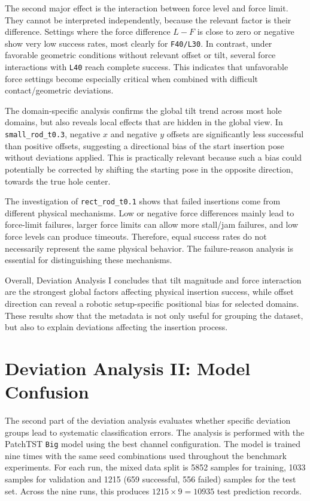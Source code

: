 The second major effect is the interaction between force level and force limit. They cannot be interpreted independently, because the relevant factor is their difference. Settings where the force difference $L-F$ is close to zero or negative show very low success rates, most clearly for \texttt{F40/L30}. In contrast, under favorable geometric conditions without relevant offset or tilt, several force interactions with \texttt{L40} reach complete success. This indicates that unfavorable force settings become especially critical when combined with difficult contact/geometric deviations.

The domain-specific analysis confirms the global tilt trend across most hole domains, but also reveals local effects that are hidden in the global view. In \texttt{small\_rod\_t0.3}, negative $x$ and negative $y$ offsets are significantly less successful than positive offsets, suggesting a directional bias of the start insertion pose without deviations applied. This is practically relevant because such a bias could potentially be corrected by shifting the starting pose in the opposite direction, towards the true hole center.

The investigation of \texttt{rect\_rod\_t0.1} shows that failed insertions come from different physical mechanisms. Low or negative force differences mainly lead to force-limit failures, larger force limits can allow more stall/jam failures, and low force levels can produce timeouts. Therefore, equal success rates do not necessarily represent the same physical behavior. The failure-reason analysis is essential for distinguishing these mechanisms.

Overall, Deviation Analysis I concludes that tilt magnitude and force interaction are the strongest global factors affecting physical insertion success, while offset direction can reveal a robotic setup-specific positional bias for selected domains. These results show that the metadata is not only useful for grouping the dataset, but also to explain deviations affecting the insertion process.

\section{Deviation Analysis II: Model Confusion}
\label{sec:results_deviation_analysis_2}

The second part of the deviation analysis evaluates whether specific deviation groups lead to systematic classification errors. The analysis is performed with the PatchTST \texttt{Big} model using the best channel configuration. The model is trained nine times with the same seed combinations used throughout the benchmark experiments. For each run, the mixed data split is 5852 samples for training, 1033 samples for validation and 1215 (659 successful, 556 failed) samples for the test set. Across the nine runs, this produces $1215\times 9 = 10935$ test prediction records.

